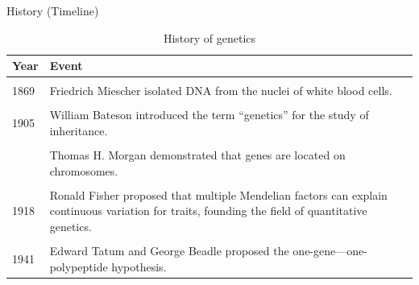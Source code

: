 \documentclass[11pt,ignorenonframetext,aspectratio=169]{beamer}
\begin{document}
\begin{frame}{History (Timeline)}
\protect\hypertarget{history-timeline}{}
\begin{table}

\caption{\label{tab:history-table1}History of genetics}
\centering
\fontsize{8}{10}\selectfont
\begin{tabular}[t]{l>{\raggedright\arraybackslash}p{40em}}
\toprule
Year & Event\\
\midrule
\cellcolor{gray!6}{1865} & \cellcolor{gray!6}{Gregor Mendel showed that traits are controlled by discrete factors now known as genes.}\\
1869 & Friedrich Miescher isolated DNA from the nuclei of white blood cells.\\
\cellcolor{gray!6}{1903} & \cellcolor{gray!6}{Walter Sutton and Theodor Boveri hypothesized that chromosomes are the hereditary elements.}\\
1905 & William Bateson introduced the term “genetics” for the study of inheritance.\\
\cellcolor{gray!6}{1908} & \cellcolor{gray!6}{G. H. Hardy and Wilhelm Weinberg proposed the Hardy–Weinberg law, the foundation for population genetics}\\
\addlinespace
1910 & Thomas H. Morgan demonstrated that genes are located on chromosomes.\\
\cellcolor{gray!6}{1913} & \cellcolor{gray!6}{Alfred Sturtevant made a genetic linkage map of the Drosophila X chromosome, the first genetic map.}\\
1918 & Ronald Fisher proposed that multiple Mendelian factors can explain continuous variation for traits, founding the field of quantitative genetics.\\
\cellcolor{gray!6}{1931} & \cellcolor{gray!6}{Harriet Creighton and Barbara McClintock showed that crossing over is the cause of recombination.}\\
1941 & Edward Tatum and George Beadle proposed the one-gene—one-polypeptide hypothesis.\\
\bottomrule
\end{tabular}
\end{table}
\end{frame}
\end{document}
